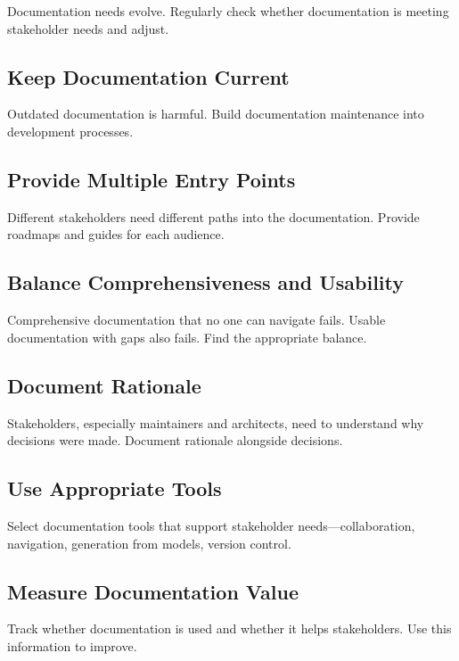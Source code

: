 \documentclass[11pt]{article}
\begin{document}
Documentation needs evolve. Regularly check whether documentation is meeting stakeholder needs and adjust.

\subsection{Keep Documentation Current}

Outdated documentation is harmful. Build documentation maintenance into development processes.

\subsection{Provide Multiple Entry Points}

Different stakeholders need different paths into the documentation. Provide roadmaps and guides for each audience.

\subsection{Balance Comprehensiveness and Usability}

Comprehensive documentation that no one can navigate fails. Usable documentation with gaps also fails. Find the appropriate balance.

\subsection{Document Rationale}

Stakeholders, especially maintainers and architects, need to understand why decisions were made. Document rationale alongside decisions.

\subsection{Use Appropriate Tools}

Select documentation tools that support stakeholder needs---collaboration, navigation, generation from models, version control.

\subsection{Measure Documentation Value}

Track whether documentation is used and whether it helps stakeholders. Use this information to improve.

\end{document}
